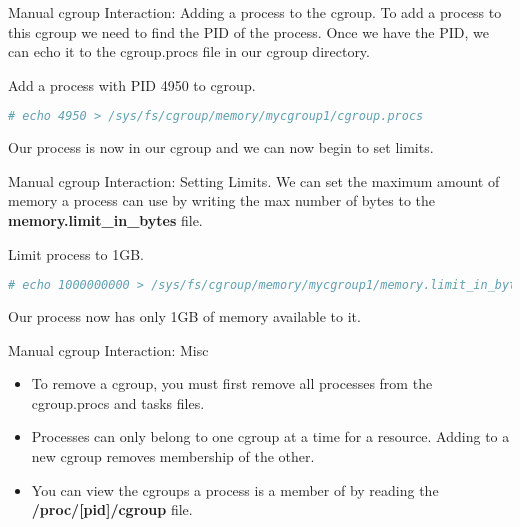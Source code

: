 \documentclass[pdf]{beamer}
\begin{document}
\begin{frame}[fragile]{Manual cgroup Interaction: Adding a process to the cgroup.}
To add a process to this cgroup we need to find the PID of the process. Once we have the PID, we can echo it to the cgroup.procs file in our cgroup directory.

\begin{block}{Add a process with PID 4950 to cgroup.}

\begin{lstlisting}[language=bash,keywordstyle=\bf,stringstyle=\it,basicstyle=\tiny]
# echo 4950 > /sys/fs/cgroup/memory/mycgroup1/cgroup.procs
\end{lstlisting}
\end{block}

Our process is now in our cgroup and we can now begin to set limits.
\end{frame}

\begin{frame}[fragile]{Manual cgroup Interaction: Setting Limits.}
We can set the maximum amount of memory a process can use by writing the max number of bytes to the \textbf{memory.limit\_in\_bytes} file. 

\begin{block}{Limit process to 1GB.}
\begin{lstlisting}[language=bash,keywordstyle=\bf,stringstyle=\it,basicstyle=\tiny]
# echo 1000000000 > /sys/fs/cgroup/memory/mycgroup1/memory.limit_in_bytes
\end{lstlisting}
\end{block}

Our process now has only 1GB of memory available to it.

\end{frame}

\begin{frame}[fragile]{Manual cgroup Interaction: Misc }
\begin{itemize}
\item To remove a cgroup, you must first remove all processes from the cgroup.procs and tasks files.
\item Processes can only belong to one cgroup at a time for a resource. Adding to a new cgroup removes membership of the other.
\item You can view the cgroups a process is a member of by reading the \textbf{/proc/[pid]/cgroup} file.
\end{itemize}

\end{frame}
\end{document}

